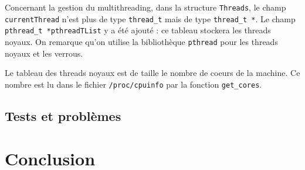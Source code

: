 \documentclass[a4paper,11pt]{article}
\begin{document}
Concernant la gestion du multithreading, dans la structure \texttt{Threads}, le champ \texttt{currentThread} n'est plus de type \texttt{thread\_t} mais de type \texttt{thread\_t *}. Le champ \texttt{pthread\_t *pthreadTList} y a été ajouté : ce tableau stockera les threads noyaux. On remarque qu'on utilise la bibliothèque \texttt{pthread} pour les threads noyaux et les verrous.

Le tableau des threads noyaux est de taille le nombre de coeurs de la machine. Ce nombre est lu dans le fichier \texttt{/proc/cpuinfo} par la fonction \texttt{get\_cores}.

\subsection{Tests et problèmes}


\section*{Conclusion} %
\end{document}
